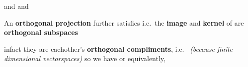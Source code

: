 \begin{itemize}
\begin{itemize}
                        \begin{itemize}

                              \vItem
                                     and 
                              \vItem
                                     and
                        \end{itemize}
            \end{itemize}
      \vItem
            An \textbf{orthogonal projection} further satisfies 
            i.e.~the \textbf{image} and \textbf{kernel} of \iMbox{\pi} are
            \textbf{orthogonal subspaces}

            \begin{itemize}

                  \vItem
                        infact they are eachother's \textbf{orthogonal compliments},
                        i.e.~ \emph{(because
                              finite-dimensional vectorspaces)}
                  \vItem
                        so we have
                  \vItem
                        or equivalently,
            \end{itemize}
\end{itemize}

\hSep %

